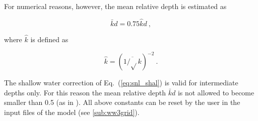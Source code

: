 \noindent
For numerical reasons, however, the mean relative depth is estimated as


\begin{equation}
\bar{k} d = 0.75 \hat{k} d \: , \label{eq:kd_num}
\end{equation}

\noindent
where $\hat{k}$ is defined as

\begin{equation}
\hat{k} = \left ( \overline{1/\sqrt{}k} \right )^{-2} \: .
\label{eq:k_hat}
\end{equation}

\noindent
The shallow water correction of Eq.~(\ref{eq:snl_shal}) is valid for
intermediate depths only. For this reason the mean relative depth
$\bar{k}d$ is not allowed to become smaller than 0.5 (as in \wam). All
above constants can be reset by the user in the input files of the
model (see \para\ref{sub:ww3grid}).

